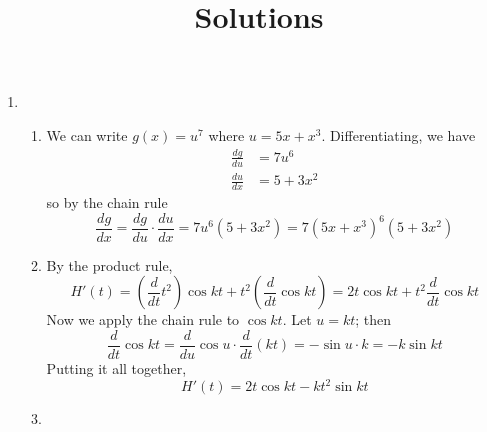 \documentclass{article}
\title{\commonPSTitleZeroTwoFive\ Solutions}
\author{\commonAuthor}
\date{\commonDateZeroTwoFive}
\newcommand{\ds}{\displaystyle}
\begin{document}
\maketitle
\begin{enumerate}
\item %
  \begin{enumerate}
  \item We can write $g(x)=u^7$ where $u=5x+x^3$.  Differentiating, we have
    \begin{align*}
      \frac{dg}{du} &= 7u^6 \\
      \frac{du}{dx} &= 5 + 3x^2
    \end{align*}
    so by the chain rule
    \begin{equation*}
      \frac{dg}{dx} = \frac{dg}{du}\cdot \frac{du}{dx}
      = 7u^6 (5+3x^2) = 7(5x+x^3)^6 (5+3x^2)
    \end{equation*}
  \item %
    By the product rule,
    \begin{equation*}
      H'(t) = \left(\frac{d}{dt}t^2\right) \cos kt +
      t^2\left(\frac{d}{dt} \cos kt \right)
      = 2t \cos kt + t^2 \frac{d}{dt} \cos kt
    \end{equation*}
    Now we apply the chain rule to $\ds \cos kt$.  Let $u=kt$; then
    \begin{equation*}
      \frac{d}{dt} \cos kt = \frac{d}{du} \cos u \cdot \frac{d}{dt} (kt)
      = -\sin u \cdot k = -k \sin kt
    \end{equation*}
    Putting it all together,
    \begin{equation*}
      H'(t) = 2t \cos kt - k t^2 \sin kt
    \end{equation*}    
  \item %

\end{enumerate}
\end{enumerate}
\end{document}
